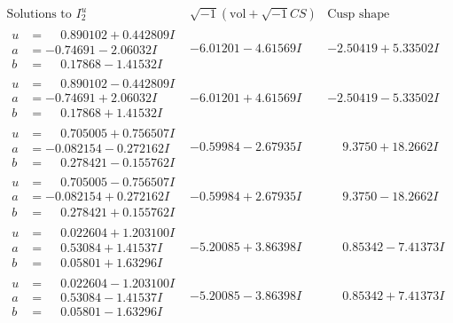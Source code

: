 \documentclass[1p]{elsarticle_modified}
\theoremstyle{definition}
\newcommand{\I}{\sqrt{-1}}
\begin{document}
$$\begin{array}{c|c|c}  
\text{Solutions to }I^u_{2}& \I (\text{vol} + \sqrt{-1}CS) & \text{Cusp shape}\\
 \hline 
\begin{aligned}
u &= \phantom{-}0.890102 + 0.442809 I \\
a &= -0.74691 - 2.06032 I \\
b &= \phantom{-}0.17868 - 1.41532 I\end{aligned}
 & -6.01201 - 4.61569 I & -2.50419 + 5.33502 I \\ \hline\begin{aligned}
u &= \phantom{-}0.890102 - 0.442809 I \\
a &= -0.74691 + 2.06032 I \\
b &= \phantom{-}0.17868 + 1.41532 I\end{aligned}
 & -6.01201 + 4.61569 I & -2.50419 - 5.33502 I \\ \hline\begin{aligned}
u &= \phantom{-}0.705005 + 0.756507 I \\
a &= -0.082154 - 0.272162 I \\
b &= \phantom{-}0.278421 - 0.155762 I\end{aligned}
 & -0.59984 - 2.67935 I & \phantom{-}9.3750 + 18.2662 I \\ \hline\begin{aligned}
u &= \phantom{-}0.705005 - 0.756507 I \\
a &= -0.082154 + 0.272162 I \\
b &= \phantom{-}0.278421 + 0.155762 I\end{aligned}
 & -0.59984 + 2.67935 I & \phantom{-}9.3750 - 18.2662 I \\ \hline\begin{aligned}
u &= \phantom{-}0.022604 + 1.203100 I \\
a &= \phantom{-}0.53084 + 1.41537 I \\
b &= \phantom{-}0.05801 + 1.63296 I\end{aligned}
 & -5.20085 + 3.86398 I & \phantom{-}0.85342 - 7.41373 I \\ \hline\begin{aligned}
u &= \phantom{-}0.022604 - 1.203100 I \\
a &= \phantom{-}0.53084 - 1.41537 I \\
b &= \phantom{-}0.05801 - 1.63296 I\end{aligned}
 & -5.20085 - 3.86398 I & \phantom{-}0.85342 + 7.41373 I \\ \hline\begin{aligned}

\end{aligned}
\end{array}$$
\end{document}
